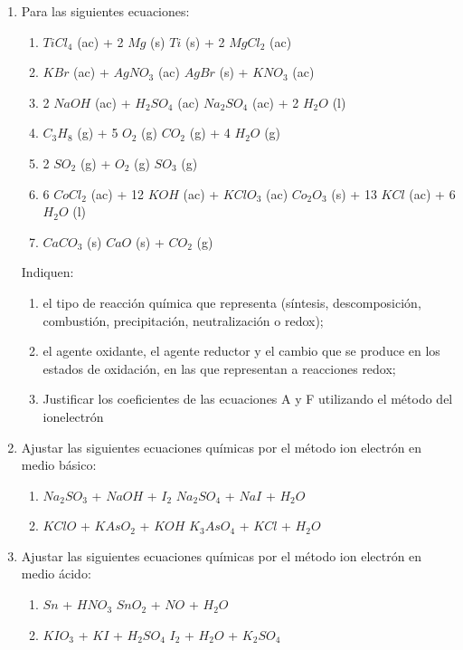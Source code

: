 \documentclass[../Práctica.root.tex]{subfiles}
\begin{document}
\begin{enumerate}
    \item Para las siguientes ecuaciones:
          \begin{enumerate}
              \item $TiCl_4$ (ac) + 2 $Mg$ (s) \to $Ti$ (s) + 2 $MgCl_2$ (ac)
              \item $KBr$ (ac) + $AgNO_3$ (ac) \to $AgBr$ (s) + $KNO_3$ (ac)
              \item 2 $NaOH$ (ac) + $H_2SO_4$ (ac) \to $Na_2SO_4$ (ac) + 2 $H_2O$ (l)
              \item $C_3H_8$ (g) + 5 $O_2$ (g)  $CO_2$ (g) + 4 $H_2O$ (g)
              \item 2 $SO_2$ (g) + $O_2$ (g)  $SO_3$ (g)
              \item 6 $CoCl_2$ (ac) + 12 $KOH$ (ac) + $KClO_3$ (ac)  $Co_2O_3$ (s) + 13 $KCl$ (ac) + 6 $H_2O$ (l)
              \item $CaCO_3$ (s) \to $CaO$ (s) + $CO_2$ (g)
          \end{enumerate}
          Indiquen:
          \begin{enumerate}
              \item el tipo de reacción química que representa (síntesis, descomposición, combustión,
                    precipitación, neutralización o redox);
              \item el agente oxidante, el agente reductor y el cambio que se produce en los estados de
                    oxidación, en las que representan a reacciones redox;
              \item Justificar los coeficientes de las ecuaciones A y F utilizando el método del ionelectrón
          \end{enumerate}

    \item Ajustar las siguientes ecuaciones químicas por el método ion electrón en medio básico:
          \begin{enumerate}
              \item $Na_2SO_3$ + $NaOH$ + $I_2$ \to $Na_2SO_4$ + $NaI$ + $H_2O$
              \item $KClO$ + $KAsO_2$ + $KOH$ \to $K_3AsO_4$ + $KCl$ + $H_2O$
          \end{enumerate}

    \item Ajustar las siguientes ecuaciones químicas por el método ion electrón en medio ácido:
          \begin{enumerate}
              \item $Sn$ + $HNO_3$ \to $SnO_2$ + $NO$ + $H_2O$
              \item $KIO_3$ + $KI$ + $H_2SO_4$ \to $I_2$ + $H_2O$ + $K_2SO_4$
          \end{enumerate}


\end{enumerate}
\end{document}
